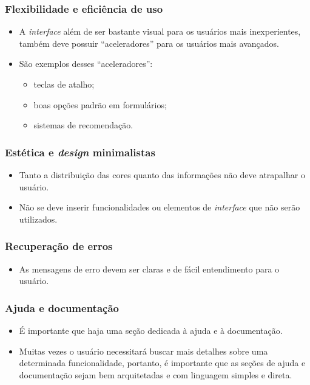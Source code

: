 \documentclass[11pt]{beamer}
\begin{document}
    \begin{frame}
      \frametitle{Flexibilidade e eficiência de uso}
      \begin{itemize}
        \item A \textit{interface} além de ser bastante visual para os usuários mais inexperientes, também deve possuir ``aceleradores'' para os usuários mais avançados.
        \item São exemplos desses ``aceleradores'':
          \begin{itemize}
            \item teclas de atalho;
            \item boas opções padrão em formulários;
            \item sistemas de recomendação.
          \end{itemize}
      \end{itemize}
    \end{frame}
    
    \begin{frame}
      \frametitle{Estética e \textit{design} minimalistas}
      \begin{itemize}
        \item Tanto a distribuição das cores quanto das informações não deve atrapalhar o usuário.
        \item Não se deve inserir funcionalidades ou elementos de \textit{interface} que não serão utilizados.
      \end{itemize}
    \end{frame}

    \begin{frame}
      \frametitle{Recuperação de erros}
      \begin{itemize}
        \item As mensagens de erro devem ser claras e de fácil entendimento para o usuário.
      \end{itemize}
    \end{frame}

    \begin{frame}
      \frametitle{Ajuda e documentação}
      \begin{itemize}
        \item É importante que haja uma seção dedicada à ajuda e à documentação.
        \item Muitas vezes o usuário necessitará buscar mais detalhes sobre uma determinada funcionalidade, portanto, é importante que as seções de ajuda e documentação sejam bem arquitetadas e com linguagem simples e direta.
      \end{itemize}
    \end{frame}
    
\end{document}
